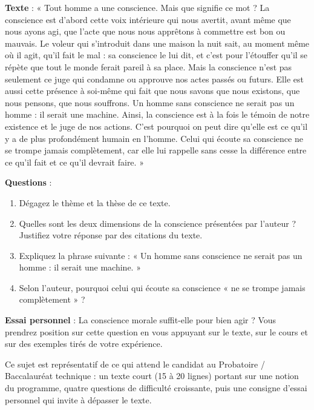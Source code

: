 \documentclass[11pt]{article}
\begin{document}
\begin{exemplebox}
\textbf{Texte} : « Tout homme a une conscience. Mais que signifie ce mot ? La conscience est d'abord cette voix intérieure qui nous avertit, avant même que nous ayons agi, que l'acte que nous nous apprêtons à commettre est bon ou mauvais. Le voleur qui s'introduit dans une maison la nuit sait, au moment même où il agit, qu'il fait le mal : sa conscience le lui dit, et c'est pour l'étouffer qu'il se répète que tout le monde ferait pareil à sa place. Mais la conscience n'est pas seulement ce juge qui condamne ou approuve nos actes passés ou futurs. Elle est aussi cette présence à soi-même qui fait que nous savons que nous existons, que nous pensons, que nous souffrons. Un homme sans conscience ne serait pas un homme : il serait une machine. Ainsi, la conscience est à la fois le témoin de notre existence et le juge de nos actions. C'est pourquoi on peut dire qu'elle est ce qu'il y a de plus profondément humain en l'homme. Celui qui écoute sa conscience ne se trompe jamais complètement, car elle lui rappelle sans cesse la différence entre ce qu'il fait et ce qu'il devrait faire. »

\textbf{Questions} :
\begin{enumerate}
\item Dégagez le thème et la thèse de ce texte.
\item Quelles sont les deux dimensions de la conscience présentées par l'auteur ? Justifiez votre réponse par des citations du texte.
\item Expliquez la phrase suivante : « Un homme sans conscience ne serait pas un homme : il serait une machine. »
\item Selon l'auteur, pourquoi celui qui écoute sa conscience « ne se trompe jamais complètement » ?
\end{enumerate}

\textbf{Essai personnel} : La conscience morale suffit-elle pour bien agir ? Vous prendrez position sur cette question en vous appuyant sur le texte, sur le cours et sur des exemples tirés de votre expérience.
\end{exemplebox}

Ce sujet est représentatif de ce qui attend le candidat au Probatoire / Baccalauréat technique : un texte court (15 à 20 lignes) portant sur une notion du programme, quatre questions de difficulté croissante, puis une consigne d'essai personnel qui invite à dépasser le texte.
\end{document}
